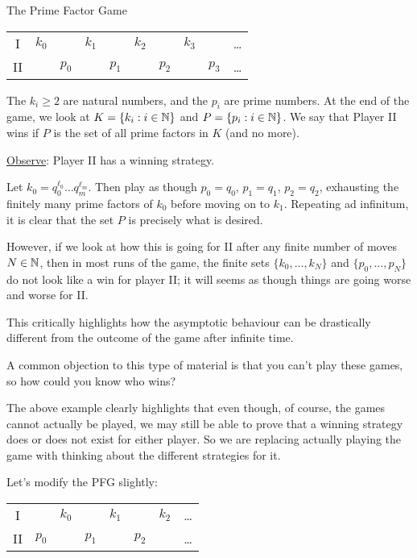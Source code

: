 \documentclass[]{article}
\begin{document}
\begin{remark}[Example] The Prime Factor Game\ \\

\begin{center}
    \begin{tabular}{cccccccccc}
        I & $k_0$ & & $k_1$ & & $k_2$ & & $k_3$ & &\dots \\
        II & & $p_0$ & & $p_1$ & & $p_2$ & & $p_3$ &\dots
    \end{tabular}
\end{center}

The $k_i\ge 2$ are natural numbers, and the $p_i$ are prime numbers. At the end of the game, we look at $K = \{k_i:i\in \mathbb{N}\}$ and $P = \{p_i:i \in \mathbb{N}\}$. We say that Player II wins if $P$ is the set of all prime factors in $K$ (and no more).

\underline{Observe}: Player II has a winning strategy.

Let $k_0 = q_0^{\ell_0}\dots q_m^{\ell_m}$. Then play as though $p_0 = q_0$, $p_1 = q_1$, $p_2 = q_2$, exhausting the finitely many prime factors of $k_0$ before moving on to $k_1$. Repeating ad infinitum, it is clear that the set $P$ is precisely what is desired.

However, if we look at how this is going for II after any finite number of moves $N \in \mathbb{N}$, then in most runs of the game, the finite sets $\{k_0,\dots,k_N\}$ and $\{p_0,\dots,p_N\}$ do not look like a win for player II; it will seems as though things are going worse and worse for II.

This critically highlights how the asymptotic behaviour can be drastically different from the outcome of the game after infinite time.
\end{remark}

A common objection to this type of material is that you can't play these games, so how could you know who wins?

The above example clearly highlights that even though, of course, the games cannot actually be played, we may still be able to prove that a winning strategy does or does not exist for either player. So we are replacing actually playing the game with thinking about the different strategies for it.

Let's modify the PFG slightly:

\begin{center}
    \begin{tabular}{cccccccc}
        I & & $k_0$ & & $k_1$ & & $k_2$ & \dots \\ 
        II & $p_0$ & & $p_1$ & & $p_2$ & & \dots
    \end{tabular}
\end{center}
\end{document}
